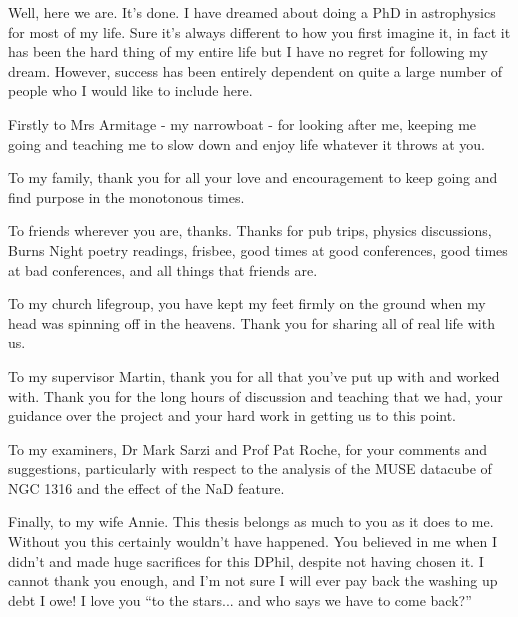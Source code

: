 \begin{acknowledgements}
Well, here we are. It's done. I have dreamed about doing a PhD in astrophysics for most of my life. Sure it's always different to how you first imagine it, in fact it has been the hard thing of my entire life but I have no regret for following my dream. However, success has been entirely dependent on quite a large number of people who I would like to include here. 

Firstly to Mrs Armitage - my narrowboat - for looking after me, keeping me going and teaching me to slow down and enjoy life whatever it throws at you. 

To my family, thank you for all your love and encouragement to keep going and find purpose in the monotonous times. 

To friends wherever you are, thanks. Thanks for pub trips, physics discussions, Burns Night poetry readings, frisbee, good times at good conferences, good times at bad conferences, and all things that friends are.

To my church lifegroup, you have kept my feet firmly on the ground when my head was spinning off in the heavens. Thank you for sharing all of real life with us. 

To my supervisor Martin, thank you for all that you've put up with and worked with. Thank you for the long hours of discussion and teaching that we had, your guidance over the project and your hard work in getting us to this point. 

To my examiners, Dr Mark Sarzi and Prof Pat Roche, for your comments and suggestions, particularly with respect to the analysis of the MUSE datacube of NGC 1316 and the effect of the NaD feature. 

Finally, to my wife Annie. This thesis belongs as much to you as it does to me. Without you this certainly wouldn't have happened. You believed in me when I didn't and made huge sacrifices for this DPhil, despite not having chosen it. I cannot thank you enough, and I'm not sure I will ever pay back the washing up debt I owe! I love you ``to the stars... and who says we have to come back?''
\end{acknowledgements}